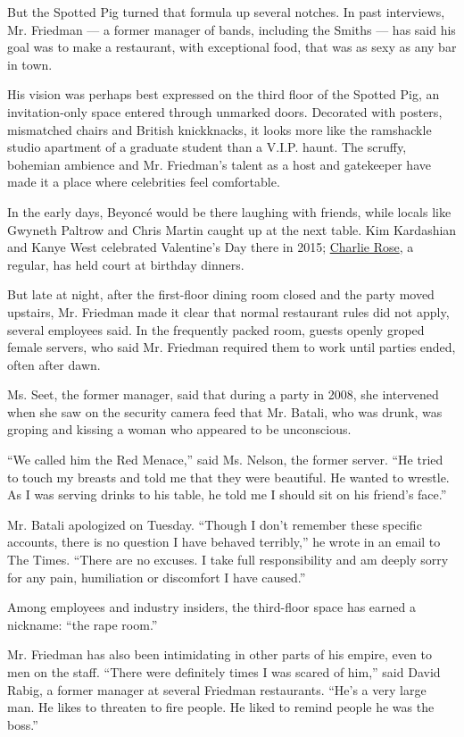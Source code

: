 But the Spotted Pig turned that formula up several notches. In past
interviews, Mr. Friedman --- a former manager of bands, including the
Smiths --- has said his goal was to make a restaurant, with exceptional
food, that was as sexy as any bar in town.

His vision was perhaps best expressed on the third floor of the Spotted
Pig, an invitation-only space entered through unmarked doors. Decorated
with posters, mismatched chairs and British knickknacks, it looks more
like the ramshackle studio apartment of a graduate student than a V.I.P.
haunt. The scruffy, bohemian ambience and Mr. Friedman's talent as a
host and gatekeeper have made it a place where celebrities feel
comfortable.

In the early days, Beyoncé would be there laughing with friends, while
locals like Gwyneth Paltrow and Chris Martin caught up at the next
table. Kim Kardashian and Kanye West celebrated Valentine's Day there in
2015;
\href{https://www.nytimes.com/2017/11/20/us/charlie-rose-women.html}{Charlie
Rose}, a regular, has held court at birthday dinners.

But late at night, after the first-floor dining room closed and the
party moved upstairs, Mr. Friedman made it clear that normal restaurant
rules did not apply, several employees said. In the frequently packed
room, guests openly groped female servers, who said Mr. Friedman
required them to work until parties ended, often after dawn.

Ms. Seet, the former manager, said that during a party in 2008, she
intervened when she saw on the security camera feed that Mr. Batali, who
was drunk, was groping and kissing a woman who appeared to be
unconscious.

``We called him the Red Menace,'' said Ms. Nelson, the former server.
``He tried to touch my breasts and told me that they were beautiful. He
wanted to wrestle. As I was serving drinks to his table, he told me I
should sit on his friend's face.''

Mr. Batali apologized on Tuesday. ``Though I don't remember these
specific accounts, there is no question I have behaved terribly,'' he
wrote in an email to The Times. ``There are no excuses. I take full
responsibility and am deeply sorry for any pain, humiliation or
discomfort I have caused.''

Among employees and industry insiders, the third-floor space has earned
a nickname: ``the rape room.''

Mr. Friedman has also been intimidating in other parts of his empire,
even to men on the staff. ``There were definitely times I was scared of
him,'' said David Rabig, a former manager at several Friedman
restaurants. ``He's a very large man. He likes to threaten to fire
people. He liked to remind people he was the boss.''

